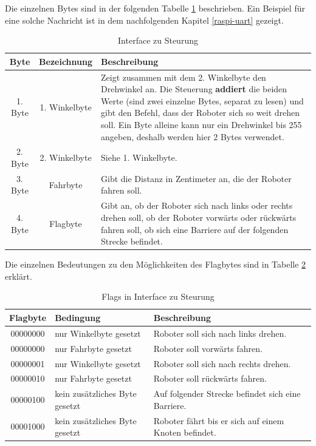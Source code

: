 Die einzelnen Bytes sind in der folgenden Tabelle \ref{table:interface-to-tiny} beschrieben. Ein Beispiel für eine solche Nachricht ist in dem nachfolgenden Kapitel \ref{raspi-uart} gezeigt.

\begin{table}[H]
\centering
\small
\begin{tabularx}{\textwidth}{|c|c|X|}
\hline
  \textbf{Byte} &\textbf{Bezeichnung} & \textbf{Beschreibung}\\
  \hline
      1. Byte&1. Winkelbyte &Zeigt zusammen mit dem 2. Winkelbyte den Drehwinkel an. Die Steuerung \textbf{addiert} die beiden Werte (sind zwei einzelne Bytes, separat zu lesen) und gibt den Befehl, dass der Roboter sich so weit drehen soll. Ein Byte alleine kann nur ein Drehwinkel bis 255 angeben, deshalb werden hier 2 Bytes verwendet.\\
  \hline
2. Byte&2. Winkelbyte&Siehe 1. Winkelbyte.\\
  \hline
  3. Byte&Fahrbyte&Gibt die Distanz in Zentimeter an, die der Roboter fahren soll.\\
  \hline
  4. Byte&Flagbyte&Gibt an, ob der Roboter sich nach links oder rechts drehen soll, ob der Roboter vorwärts oder rückwärts fahren soll, ob sich eine Barriere auf der folgenden Strecke befindet.\\
  \hline
  \end{tabularx}
\caption{Interface zu Steurung}
\label{table:interface-to-tiny}
\end{table}

Die einzelnen Bedeutungen zu den Möglichkeiten des Flagbytes sind in Tabelle \ref{table:flag-to-tiny} erklärt.

\begin{table}[H]
\centering
\small
\begin{tabularx}{\textwidth}{|c|X|X|}
\hline
  \textbf{Flagbyte} & \textbf{Bedingung} & \textbf{Beschreibung}\\
  \hline
00000000&nur Winkelbyte gesetzt&Roboter soll sich nach links drehen.\\
  \hline
00000000&nur Fahrbyte gesetzt&Roboter soll vorwärts fahren.\\
  \hline
00000001&nur Winkelbyte gesetzt&Roboter soll sich nach rechts drehen.\\
  \hline

00000010&nur Fahrbyte gesetzt&Roboter soll rückwärts fahren.\\
  \hline

00000100&kein zusätzliches Byte gesetzt&Auf folgender Strecke befindet sich eine Barriere.\\
  \hline
00001000&kein zusätzliches Byte gesetzt&Roboter fährt bis er sich auf einem Knoten befindet.\\
  \hline
  \end{tabularx}
\caption{Flags in Interface zu Steurung}
\label{table:flag-to-tiny}
\end{table}



